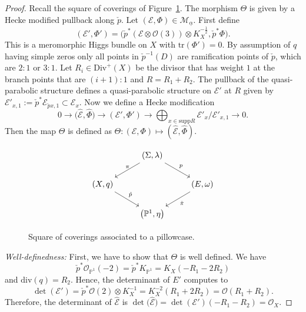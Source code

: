 \documentclass[10pt,a4paper]{amsart}
\numberwithin{equation}{section}
\theoremstyle{definition}
\newcommand{\supp}{\mathrm{supp}}
\renewcommand{\div}{\mathrm{div}}
\newcommand{\Div}{\mathrm{Div}}
\renewcommand{\to}{\rightarrow}
\newcommand{\ualpha}{\underline{\alpha}}
\newcommand{\calE}{\mathcal{E}}
\newcommand{\calM}{\mathcal{M}}
\newcommand{\calO}{\mathcal{O}}
\newcommand{\PP}{\mathbb{P}}
\newcommand{\tr}{\mathrm{tr}}
\begin{document}
\begin{proof}
 Recall the square of coverings of Figure~\ref{fig:square-of-covers}. The morphism $\Theta$ is given by a Hecke modified pullback along $\check{p}$. Let $(\calE,\Phi) \in \calM_{\ualpha}$. First define
 \[ (\calE',\Phi')= \bigl(\check{p}^*(\calE\otimes\calO(3))\otimes K_X^{-\frac12}, \check{p}^*\Phi\bigr).
 \]
 This is a meromorphic Higgs bundle on $X$ with $\tr(\Phi')=0$. By assumption of $q$ having simple zeros only all points in $\check{p}^{-1}(D)$ are ramification points of $\check{p}$, which are $2:1$ or $3:1$. Let $R_i \in \Div^+(X)$ be the divisor that has weight $1$ at the branch points that are $(i+1):1$ and $R=R_1 +R_2$. The pullback of the quasi-parabolic structure defines a quasi-parabolic structure on $\calE'$ at $R$ given by $\calE'_{x,1}:=\check{p}^*\calE_{\check{p}x,1} \subset \calE_{x}$. Now we define a Hecke modification
 \[ 0 \to \bigl(\hat{\calE},\hat{\Phi}\bigr) \to (\calE',\Phi') \to \bigoplus_{x \in \supp R} \calE'_{x}/\calE'_{x,1} \to 0.
 \]
 Then the map $\Theta$ is defined as
 $\Theta\colon (\calE,\Phi) \mapsto (\hat{\calE},\hat{\Phi})$.

 \begin{figure}[h]
$$
 \begin{tikzcd}
	& (\Sigma,\lambda) \ar[rd,"p"] \ar[ld,"\pi" above]& \\ (X,q) \ar[rd,"\check{p}"] & & (E, \omega) \ar[ld,"\check{\pi}"] \\ & \bigl(\PP^1,\eta\bigr) &
 \end{tikzcd}\vspace{-3mm}
$$
 \caption{Square of coverings associated to a pillowcase.}\label{fig:square-of-covers}
 \end{figure}

 \textit{Well-definedness:} First, we have to show that $\Theta$ is well defined. We have
 \[ \check{p}^*\calO_{\PP^1}(-2)=\check{p}^*K_{\PP^1}=K_X(-R_1-2R_2)
 \]
 and $\div(q)=R_2$. Hence, the determinant of $E'$ computes to
 \[ \det(\calE')=\check{p}^*\calO(2) \otimes K_X^{-1}=K_X^{-2}(R_1+2R_2)=\calO(R_1+R_2).
 \]
 Therefore, the determinant of $\hat{\calE}$ is $\det\bigl(\hat{\calE}\bigr)=\det(\calE')(-R_1-R_2)=\calO_X$.


\end{proof}
\end{document}
